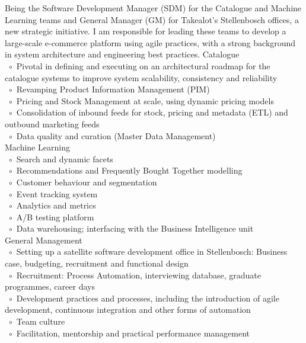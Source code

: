 \documentclass[10pt,a4paper,final]{columncv}
\newcommand{\cvitembullet}{~$\circ$~}
\newcommand{\cvitempbullet}{\phantom{\cvitembullet}}
\begin{document}
\begin{cvenv}
         {Being the Software Development Manager (SDM) for the Catalogue and Machine 
          Learning teams and General Manager (GM) for Takealot's Stellenbosch offices, a 
          new strategic initiative. I am responsible for leading these teams to develop a 
          large-scale e-commerce platform using agile practices, with a strong background 
          in system architecture and engineering best practices.}
         {Catalogue \\
		  \cvitembullet Pivotal in defining and executing on an architectural roadmap for  
		  \cvitempbullet the catalogue systems to improve system scalability, consistency 
		  \cvitempbullet and reliability \\
		  \cvitembullet Revamping Product Information Management (PIM) \\
		  \cvitembullet Pricing and Stock Management at scale, using dynamic pricing 
		  \cvitempbullet models \\
		  \cvitembullet Consolidation of inbound feeds for stock, pricing and metadata 
		  \cvitempbullet (ETL) and outbound marketing feeds \\
		  \cvitembullet Data quality and curation (Master Data Management) \\
		  Machine Learning \\
		  \cvitembullet Search and dynamic facets \\
		  \cvitembullet Recommendations and Frequently Bought Together modelling \\
		  \cvitembullet Customer behaviour and segmentation \\
		  \cvitembullet Event tracking system \\
		  \cvitembullet Analytics and metrics \\
		  \cvitembullet A/B testing platform \\
		  \cvitembullet Data warehousing; interfacing with the Business Intelligence unit \\
		  General Management \\
		  \cvitembullet Setting up a satellite software development office in Stellenbosch:
		  \cvitempbullet Business case, budgeting, recruitment and functional design \\
		  \cvitembullet Recruitment: Process Automation, interviewing database,  
		  \cvitempbullet graduate programmes, career days \\
		  \cvitembullet Development practices and processes, including the introduction 
		  \cvitempbullet of agile development, continuous integration and other forms of 
		  \cvitempbullet automation \\
		  \cvitembullet Team culture \\
		  \cvitembullet Facilitation, mentorship and practical performance management 
          }
\end{cvenv}
\end{document}
